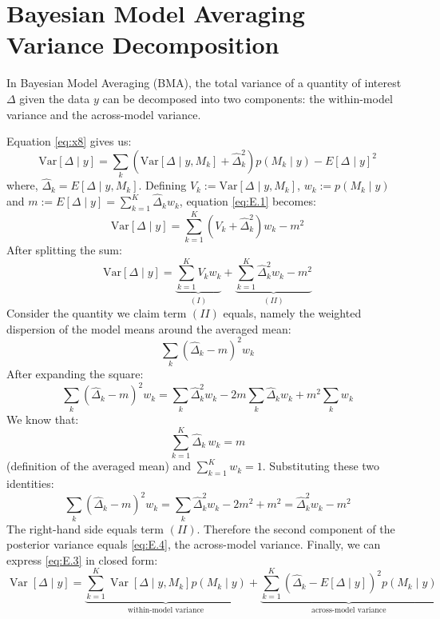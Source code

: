 \documentclass[12pt, a4paper]{article}
\begin{document}
\section{Bayesian Model Averaging Variance Decomposition}
\label{sec:BMA_var_decomp}

In Bayesian Model Averaging (BMA), the total variance of a quantity of interest $\Delta$ given the data $y$ can be decomposed into two components: the within-model variance and the across-model variance. 

Equation \eqref{eq:x8} gives us:
\begin{equation} \label{eq:E.1}
\mathrm{Var}[\Delta \mid y] = \sum_{k} \left( \mathrm{Var}[\Delta \mid y, M_k] + \hat{\Delta}_k^2 \right) p(M_k \mid y) - E[\Delta \mid y]^2
\end{equation}
where, $\hat \Delta_k = E[\Delta\mid y, M_k]$. Defining $V_k := \mathrm{Var}[\Delta \mid y, M_k]$, $w_k := p(M_k \mid y)$ and $m := E[\Delta \mid y] = \sum_{k=1}^{K} \hat{\Delta}_k w_k$, equation \eqref{eq:E.1} becomes:
\begin{equation} \label{eq:E.2}
\mathrm{Var}[\Delta \mid y] = \sum_{k=1}^{K} (V_k + \hat{\Delta}_k^2) w_k - m^2
\end{equation}
After splitting the sum:
\begin{equation} \label{eq:E.3}
\mathrm{Var}[\Delta \mid y] = \underbrace{\sum_{k=1}^{K} V_k w_k}_{(I)} + \underbrace{\sum_{k=1}^{K} \hat{\Delta}_k^2 w_k - m^2}_{(II)}
\end{equation}
Consider the quantity we claim term $(II)$ equals, namely the weighted dispersion of the model means around the averaged mean:
\begin{equation} \label{eq:E.4}
\sum_{k} (\hat{\Delta}_k - m)^2 w_k
\end{equation}
After expanding the square:
\begin{equation} \label{eq:E.5}
\sum_{k} (\hat{\Delta}_k - m)^2 w_k = \sum_{k} \hat{\Delta}_k^2 w_k - 2m \sum_{k} \hat{\Delta}_k w_k + m^2 \sum_{k} w_k
\end{equation}
We know that:
\begin{equation} \label{eq:x}
\sum_{k=1}^{K} \hat{\Delta}_k\, w_k = m
\end{equation}
(definition of the averaged mean) and $\sum_{k=1}^{K}w_k = 1$. Substituting these two identities:
\begin{equation} \label{eq:E.6}
\sum_{k} (\hat{\Delta}_k - m)^2 w_k = \sum_{k} \hat{\Delta}_k^2 w_k - 2m^2 + m^2 = \hat{\Delta}_k^2 w_k - m^2
\end{equation}
The right-hand side equals term $(II)$. Therefore the second component of the posterior variance equals \eqref{eq:E.4}, the across-model variance. Finally, we can express \eqref{eq:E.3} in closed form:
\begin{equation} \label{eq:E.7}
\operatorname{Var}[\Delta \mid y] = \underbrace{\sum_{k=1}^{K} \operatorname{Var}[\Delta \mid y, M_k] p(M_k \mid y)}_{\text{within-model variance}} + \underbrace{\sum_{k=1}^{K} \left( \hat{\Delta}_k - E[\Delta \mid y] \right)^2 p(M_k \mid y)}_{\text{across-model variance}}
\end{equation}
\end{document}

